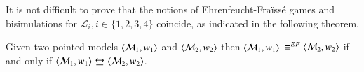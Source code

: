 It is not difficult to prove that the notions of Ehrenfeucht-Fra\"iss\'e games and bisimulations for $\mathcal{L}_i, i \in \{1,2,3,4\}$ coincide, as
indicated in the following theorem.

\begin{thm}\label{thm:equiv-g-s}
Given two pointed models $\langle \mathcal{M}_1,w_1 \rangle$ and
$\langle \mathcal{M}_2,w_2 \rangle$ then $\langle \mathcal{M}_1,w_1 \rangle$ $\equiv^{EF} \langle \mathcal{M}_2,w_2 \rangle$
if and only if $\tup{\model_1,w_1} \bisim \tup{\model_2,w_2}$.
\end{thm}


